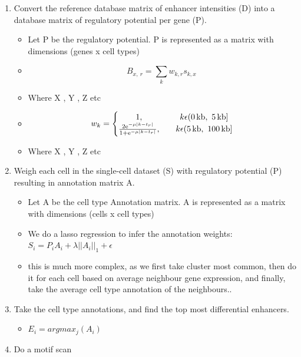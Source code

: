 \begin{enumerate}[label=(\Alph*)]
    \item Convert the reference database matrix of enhancer intensities (D) into a database matrix of regulatory potential per gene (P).
    \begin{itemize}
        \item Let P be the regulatory potential. P is represented as a matrix with dimensions (genes x cell types)
        \item \begin{equation*}{B_{x,\ r}} = \sum\limits_k {{w_{k,r}}{s_{k,x}}\ } \end{equation*}
        \item Where X , Y , Z etc
        \item \begin{equation*} w_k=\left\{\begin{matrix} 1, && k\epsilon (0\,{\rm kb},\ 5\,{\rm kb}]\\ \frac{2{\rm e}^{-\mu|k-t_r|} }{1+{\rm e}^{-\mu|k-t_r|}}, && k\epsilon (5\,{\rm kb},\ 100\,{\rm kb}] \end{matrix}\right. \end{equation*}
        \item Where X , Y , Z etc
    \end{itemize}
    \item Weigh each cell in the single-cell dataset (S) with regulatory potential (P) resulting in annotation matrix A.
    \begin{itemize}
        \item Let A be the cell type Annotation matrix. A is represented as a matrix with dimensions (cells x cell types)
        \item We do a lasso regression to infer the annotation weights: $S_i = P_i A_i + \lambda ||A_i||_1 +\epsilon$
        \item this is much more complex, as we first take cluster most common, then do it for each cell based on average neighbour gene expression, and finally, take the average cell type annotation of the neighbours..
    \end{itemize}
    \item Take the cell type annotations, and find the top most differential enhancers.
    \begin{itemize}
        \item $E_i = argmax_j(A_i)$
    \end{itemize}
    \item Do a motif scan

\end{enumerate}
